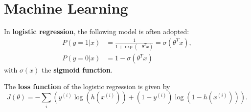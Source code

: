 \part{Machine Learning}


\begin{outline}
  \1 In \textbf{logistic regression}, the following model is often adopted:
  \begin{align*}
    P(y=1|x) &= \frac{1}{1+\exp(-\theta^Tx)} = \sigma(\theta^Tx),\\
    P(y=0|x) &= 1 - \sigma(\theta^Tx)
  \end{align*}
  with $\sigma(x)$ the \textbf{sigmoid function}.

  \1 The \textbf{loss function} of the logistic regression is given by 
  \begin{equation*}
    J(\theta) = -\sum_i (y^{(i)}\log(h(x^{(i)})) + (1-y^{(i)})\log(1-h(x^{(i)}))).
  \end{equation*}

\end{outline}

